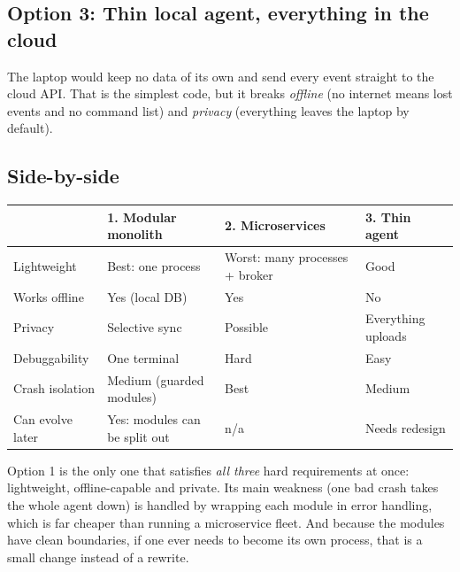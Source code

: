 \documentclass[11pt,a4paper]{article}
\begin{document}
\subsection{Option 3: Thin local agent, everything in the cloud}

The laptop would keep no data of its own and send every event straight to the cloud API.
That is the simplest code, but it breaks \emph{offline} (no internet means lost events and
no command list) and \emph{privacy} (everything leaves the laptop by default).

\subsection{Side-by-side}

\begin{center}
\renewcommand{\arraystretch}{1.25}
\begin{tabularx}{\textwidth}{l X X X}
\toprule
 & \textbf{1. Modular monolith} & \textbf{2. Microservices} & \textbf{3. Thin agent} \\
\midrule
Lightweight      & \textcolor{local}{Best: one process}  & \textcolor{warn}{Worst: many processes + broker} & \textcolor{local}{Good} \\
Works offline    & \textcolor{local}{Yes (local DB)}     & \textcolor{local}{Yes}           & \textcolor{warn}{No} \\
Privacy          & \textcolor{local}{Selective sync}     & \textcolor{local}{Possible}      & \textcolor{warn}{Everything uploads} \\
Debuggability    & \textcolor{local}{One terminal}       & \textcolor{warn}{Hard}           & \textcolor{local}{Easy} \\
Crash isolation  & Medium (guarded modules) & \textcolor{local}{Best}  & Medium \\
Can evolve later & \textcolor{local}{Yes: modules can be split out} & n/a & \textcolor{warn}{Needs redesign} \\
\bottomrule
\end{tabularx}
\end{center}

\begin{why}
Option 1 is the only one that satisfies \emph{all three} hard requirements at once:
lightweight, offline-capable and private. Its main weakness (one bad crash takes the
whole agent down) is handled by wrapping each module in error handling, which is far
cheaper than running a microservice fleet. And because the modules have clean boundaries,
if one ever needs to become its own process, that is a small change instead of a rewrite.
\end{why}
\end{document}
